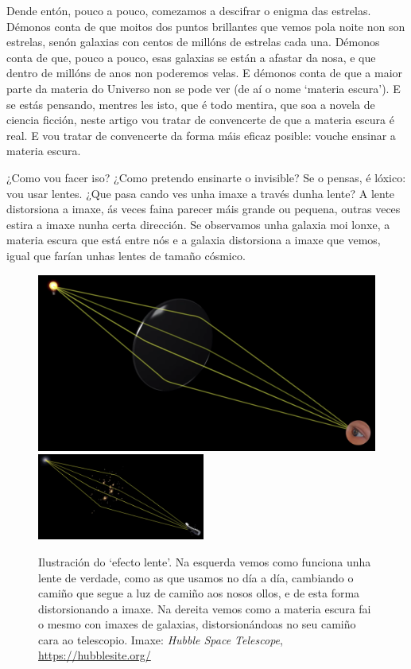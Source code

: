 \documentclass{article}
\begin{document}
Dende entón, pouco a pouco, comezamos a descifrar o enigma das estrelas. Démonos conta de 
que moitos dos puntos brillantes que vemos pola noite non son estrelas, senón galaxias con 
centos de millóns de estrelas cada una. Démonos conta de que, pouco a pouco, esas galaxias se están a afastar da nosa, e que dentro de millóns de anos non poderemos velas. E démonos conta de 
que a maior parte da materia do Universo non se pode ver (de aí o nome `materia escura'). E se estás pensando, mentres les isto, que é todo mentira, que soa a novela de ciencia ficción, 
neste artigo vou tratar de convencerte de que a materia escura é real. E vou tratar de convencerte 
da forma máis eficaz posible: vouche ensinar a materia escura. 

¿Como vou facer iso? ¿Como pretendo ensinarte o invisible? Se o pensas, é lóxico: vou usar lentes. 
¿Que pasa cando ves unha imaxe a través dunha lente? A lente distorsiona a imaxe, ás veces faina 
parecer máis grande ou pequena, outras veces estira a imaxe nunha certa dirección. Se observamos 
unha galaxia moi lonxe, a materia escura que está entre nós e a galaxia distorsiona a imaxe que 
vemos, igual que farían unhas lentes de tamaño cósmico.

\begin{figure}[h]
\includegraphics[width=0.49  \textwidth]{lens1}
\includegraphics[width=0.49\textwidth]{lens2}
\caption{Ilustración do `efecto lente'. Na esquerda vemos como funciona unha lente de verdade, como 
as que usamos no día a día, cambiando o camiño que segue a luz de camiño aos nosos ollos, e de esta forma 
distorsionando a imaxe. Na dereita vemos como a materia escura fai o mesmo con imaxes de galaxias, 
distorsionándoas no seu camiño cara ao telescopio. Imaxe: {\it Hubble Space Telescope}, \url{https://hubblesite.org/}
\label{fig:lens_example}
}
\end{figure}
\end{document}
